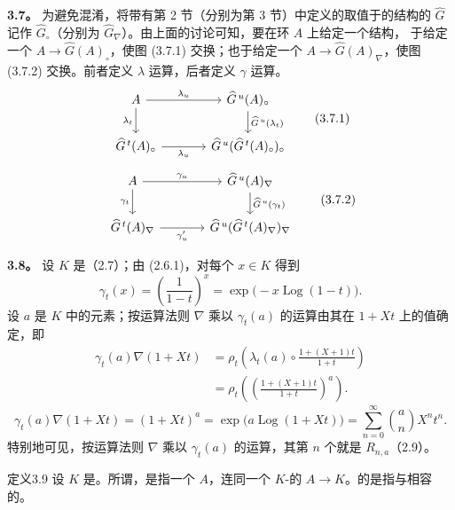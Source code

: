 \textbf{3.7。} 为避免混淆，将带有第 2 节（分别为第 3 节）中定义的取值于的结构的 $\widehat G$ 记作 $\widehat G_\circ$（分别为 $\widehat G_\nabla$）。由上面的讨论可知，要在环 $A$ 上给定一个结构，
于给定一个 $A\longrightarrow\widehat G(A)_\circ$，使图 (3.7.1) 交换；也于给定一个 $A\longrightarrow\widehat G(A)_\nabla$，使图 (3.7.2) 交换。前者定义 $\lambda$ 运算，后者定义 $\gamma$ 运算。
\[
\begin{tikzcd}[column sep=large]
A \arrow[r,"\lambda_u"] \arrow[d,"\lambda_t"'] &
\widehat G^{\,u}(A)_\circ \arrow[d,"{\widehat G^{\,u}(\lambda_t)}"]\\
\widehat G^{\,t}(A)_\circ \arrow[r,"\lambda_u"'] &
\widehat G^{\,u}(\widehat G^{\,t}(A)_\circ)_\circ
\end{tikzcd}
\tag{3.7.1}
\]
\[
\begin{tikzcd}[column sep=large]
A \arrow[r,"\gamma_u"] \arrow[d,"\gamma_t"'] &
\widehat G^{\,u}(A)_\nabla \arrow[d,"{\widehat G^{\,u}(\gamma_t)}"]\\
\widehat G^{\,t}(A)_\nabla \arrow[r,"\gamma'_u"'] &
\widehat G^{\,u}(\widehat G^{\,t}(A)_\nabla)_\nabla
\end{tikzcd}
\tag{3.7.2}
\]

\textbf{3.8。} 设 $K$ 是（2.7）；由 (2.6.1)，对每个 $x\in K$ 得到
\[
\gamma_t(x)=\left(\frac1{1-t}\right)^x
=\exp\bigl(-x\operatorname{Log}(1-t)\bigr).
\tag{3.8.1}
\]
设 $a$ 是 $K$ 中的元素；按运算法则 $\nabla$ 乘以 $\gamma_t(a)$ 的运算由其在 $1+Xt$ 上的值确定，即
\[
\begin{aligned}
\gamma_t(a)\nabla(1+Xt)
&=\rho_t\left(\lambda_t(a)\circ\frac{1+(X+1)t}{1+t}\right)\\
&=\rho_t\left(\left(\frac{1+(X+1)t}{1+t}\right)^a\right).
\end{aligned}
\]
\[
\gamma_t(a)\nabla(1+Xt)=(1+Xt)^a
=\exp\bigl(a\operatorname{Log}(1+Xt)\bigr)
=\sum_{n=0}^{\infty}\binom anX^nt^n.
\tag{3.8.2}
\]
特别地可见，按运算法则 $\nabla$ 乘以 $\gamma_t(a)$ 的运算，其第 $n$ 个就是 $R_{n,a}$（2.9）。

\begin{SGAresult}{定义}{3.9}
设 $K$ 是。所谓，是指一个 $A$，连同一个 $K$-的 $A\longrightarrow K$。的是指与相容的。
\end{SGAresult}

